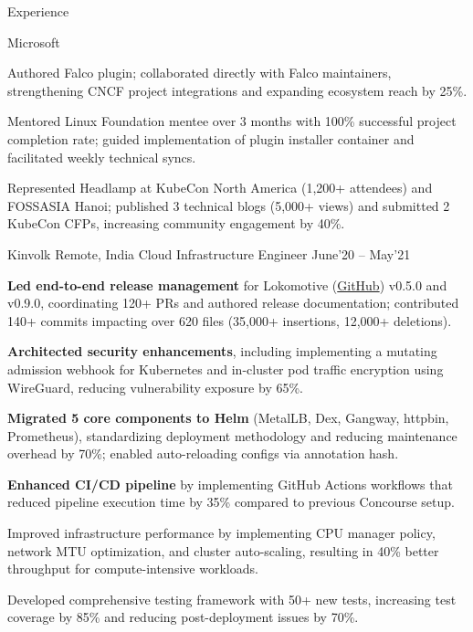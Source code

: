 \documentclass{resume} %
\begin{document}
\begin{rSection}{Experience}
\begin{rWorkSection}{Microsoft}
{    \item Authored Falco plugin; collaborated directly with Falco maintainers, strengthening CNCF project integrations and expanding ecosystem reach by 25\%.
    \item Mentored Linux Foundation mentee over 3 months with 100\% successful project completion rate; guided implementation of plugin installer container and facilitated weekly technical syncs.
    \item Represented Headlamp at KubeCon North America (1,200+ attendees) and FOSSASIA Hanoi; published 3 technical blogs (5,000+ views) and submitted 2 KubeCon CFPs, increasing community engagement by 40\%.
  }
  \end{rWorkSection}

  \begin{rWorkSection}{Kinvolk}
                     {Remote, India}
                     {Cloud Infrastructure Engineer}
                     {June'20 -- May'21} {
    \item \textbf{Led end-to-end release management} for Lokomotive (\href{https://github.com/kinvolk/lokomotive/}{GitHub}) v0.5.0 and v0.9.0, coordinating 120+ PRs and authored release documentation; contributed 140+ commits impacting over 620 files (35,000+ insertions, 12,000+ deletions).
    \item \textbf{Architected security enhancements}, including implementing a mutating admission webhook for Kubernetes and in-cluster pod traffic encryption using WireGuard, reducing vulnerability exposure by 65\%.
    \item \textbf{Migrated 5 core components to Helm} (MetalLB, Dex, Gangway, httpbin, Prometheus), standardizing deployment methodology and reducing maintenance overhead by 70\%; enabled auto-reloading configs via annotation hash.
    \item \textbf{Enhanced CI/CD pipeline} by implementing GitHub Actions workflows that reduced pipeline execution time by 35\% compared to previous Concourse setup.
    \item Improved infrastructure performance by implementing CPU manager policy, network MTU optimization, and cluster auto-scaling, resulting in 40\% better throughput for compute-intensive workloads.
    \item Developed comprehensive testing framework with 50+ new tests, increasing test coverage by 85\% and reducing post-deployment issues by 70\%.
  }
  \end{rWorkSection}


\end{rSection}
\end{document}
